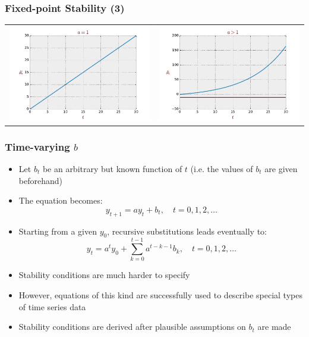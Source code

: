 \documentclass[10pt,usenames,dvipsnames]{beamer}
\theoremstyle{plain}
\theoremstyle{definition}
\begin{document}
\begin{frame}[fragile]
\frametitle{Fixed-point Stability (3)}
\begin{center}
	\begin{tabular}{cc}
		\includegraphics[scale=0.3]{./figs/fig5} & \includegraphics[scale=0.3]{./figs/fig6}
\end{tabular}

\end{center}
\end{frame}

\begin{frame}[fragile]
\frametitle{Time-varying $b$}
\begin{itemize}
	\item Let $b_{t}$ be an arbitrary but known function of $t$ (i.e. the values of $b_{t}$ are given beforehand)
	\item The equation becomes:
	\[
		y_{t+1} = ay_{t} + b_{t}, \quad t = 0,1,2,\ldots
	\]
	\item Starting from a given $y_{0}$, recursive substitutions leads eventually to:
	\[
		y_{t} = a^{t}y_{0} + \sum_{k=0}^{t-1}a^{t-k-1}b_{k}, \quad t = 0,1,2,\ldots
	\]
	\item Stability conditions are much harder to specify
	\item However, equations of this kind are successfully used to describe special types of time series data
	\item Stability conditions are derived after plausible assumptions on $b_{t}$ are made
\end{itemize}
\end{frame}
\end{document}
